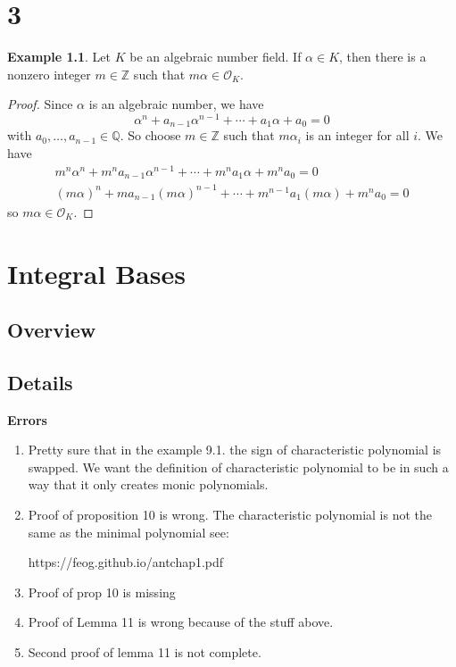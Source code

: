 \documentclass[a4paper]{book}
\theoremstyle{definition}
\newtheorem{example}{Example}[definition]
\begin{document}
\chapter{3}

\begin{example}
    Let \(K\) be an algebraic number field. If \(\alpha \in K\), then there is a nonzero integer \(m \in \mathbb{Z}\) such that \(m \alpha \in \mathcal{O}_K\).
\end{example}
\begin{proof}
    Since \(\alpha\) is an algebraic number, we have
    \begin{equation*}
        \alpha^n + a_{n-1} \alpha^{n-1} + \cdots + a_1 \alpha + a_0 = 0
    \end{equation*}
    with \(a_0, \ldots, a_{n-1} \in \mathbb{Q}\). So choose \(m \in \mathbb{Z}\) such that \(m \alpha_i\) is an integer for all \(i\). We have
    \begin{align*}
        m^n \alpha^n + m^n a_{n-1} \alpha^{n-1} + \cdots + m^n a_1 \alpha + m^n a_0 = 0 \\
        (m \alpha)^n + m a_{n-1} (m \alpha)^{n-1} + \cdots + m^{n-1} a_1 (m \alpha) + m^n a_0 = 0
    \end{align*}
    so \(m \alpha \in \mathcal{O}_K\).
\end{proof}

\chapter{Integral Bases}

\section{Overview}

\section{Details}

{\color{red}\textbf{Errors}}
\begin{enumerate}
    \item Pretty sure that in the example 9.1. the sign of characteristic polynomial is swapped. We want the definition of characteristic polynomial to be in such a way that it only creates monic polynomials.
    \item Proof of proposition 10 is wrong. The characteristic polynomial is not the same as the minimal polynomial see:
    
    https://feog.github.io/antchap1.pdf

    \item Proof of prop 10 is missing
    \item Proof of Lemma 11 is wrong because of the stuff above.
    \item Second proof of lemma 11 is not complete.
\end{enumerate}
\end{document}
